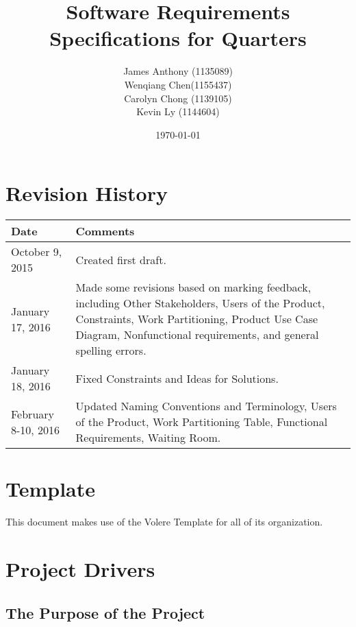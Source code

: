 \documentclass[12pt]{article}
\begin{document}
\title{Software Requirements Specifications for Quarters} 
\author{James Anthony (1135089)\\ Wenqiang Chen(1155437)\\ Carolyn Chong 
(1139105)\\ Kevin Ly (1144604)}
\date{\today}
\maketitle

\pagebreak

\tableofcontents 
\listoffigures
\listoftables

\section*{Revision History}
\begin{longtable}{|p{5cm}|p{10cm}|}
\hline
\textbf{Date}  & \textbf{Comments} \\ \hline
October 9, 2015 & Created first draft. \\ 
\hline
January 17, 2016 & Made some revisions based on marking feedback, including Other Stakeholders, Users of the Product, Constraints, Work Partitioning, Product Use Case Diagram, Nonfunctional requirements, and general spelling errors. \\ 
\hline
January 18, 2016 & Fixed Constraints and Ideas for Solutions. \\ 
\hline
February 8-10, 2016 & Updated Naming Conventions and Terminology, Users of the Product, Work Partitioning Table, Functional Requirements, Waiting Room. \\ 
\hline
\end{longtable}

\section*{Template}
This document makes use of the Volere Template for all of its organization.

\pagebreak

\section{Project Drivers}
\subsection{The Purpose of the Project}
\end{document}
